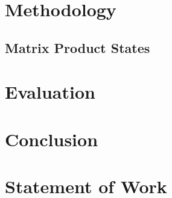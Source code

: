 \documentclass{ipgpmaster}
\begin{document}
\checkyears

\vspace*{5mm}




\def\author{Ryan, Arvind, Payal, and Will}
\def\title{CS 259: Final Project \\ Tensor Networks for Machine Learning}
\def\shorttitle{Two Qubits}
\def\unit{UCLA - MQST}
\def\team{Ryan, Arvind, Payal, and Will}
\def\spe{MQST}
\def\supervisor{Tony Nowatzki}
\def\mydate{\today}

\Entete

\begin{abstract}
For our project we chose to explore the methods of the Google X paper 'Tensor Networks for Machine Learning' by Jack Hidary et al \cite{roberts2019tensornetwork}. Here, the authors explore the use of tensor networks to improve the training performance of classifier neural networks. This is done by using tensor networks to compress the weights of the neural network, which reduces the number of parameters that need to be trained. This reduces the total amount of compute needed to train the network, at the cost of roughly 1\% model accuracy. Modeling the weights of the neural network as a tensor network also allows for the use of parallelism to contract the network (multiply to get the desired result).
\end{abstract}

\newpage
\tableofcontents
\newpage

\section{Methodology}
\subsection{Matrix Product States}
\section{Evaluation}
\section{Conclusion}
\section{Statement of Work}

\nocite{*}
\end{document}
